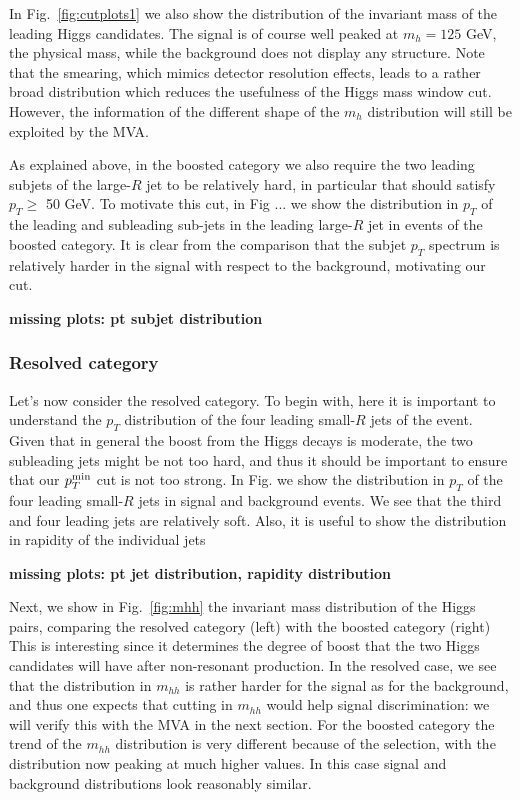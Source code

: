 In Fig.~\ref{fig:cutplots1} we also show the distribution
of the invariant mass of the leading Higgs candidates.
%
The signal is of course well peaked at $m_h=125$ GeV, the physical
mass, while the background does not display any structure.
%
Note that the smearing, which mimics detector resolution effects,
leads to a rather broad distribution which reduces the usefulness
of the Higgs mass window cut.
%
However, the information of the different shape of the $m_{h}$
distribution will still be exploited by the MVA.

As explained above, in the boosted category we also require the two
leading subjets of the large-$R$ jet to be relatively
hard, in particular that should satisfy $p_T \ge $ 50 GeV.
%
To motivate this cut, in Fig ... we show the distribution in $p_T$ of the leading
and subleading sub-jets in the leading large-$R$ jet in events
of the boosted category.
%
It is clear from the comparison that the subjet $p_T$ spectrum is
relatively harder in the signal with respect to the background,
motivating our cut.

{\bf missing plots: pt subjet distribution}

\subsubsection{Resolved category}


Let's now consider the resolved category.
%
To begin with, here it is important to understand the $p_T$ distribution
of the four leading small-$R$ jets of the event.
%
Given that in general the boost from the Higgs decays is moderate,
the two subleading jets might be not too hard, and thus it
should be important to ensure that our $p_T^{\rm min}$ cut
is not too strong.
%
In Fig. we show the distribution in $p_T$ of the four leading
small-$R$ jets in signal and background events.
%
We see that the third and four leading jets are relatively soft.
%
Also, it is useful to show the distribution in rapidity of the
individual jets

{\bf missing plots: pt jet distribution, rapidity distribution}

Next, we show in
Fig.~\ref{fig:mhh} the invariant mass distribution of the Higgs pairs,
comparing the resolved category (left) with the boosted category (right)
%
This is interesting since it determines the degree of boost that the two
Higgs candidates will have after non-resonant production.
%
In the resolved case, we see that the distribution
in $m_{hh}$ is rather harder for the signal as for the background,
and thus one expects that cutting in $m_{hh}$ would help signal
discrimination: we will verify this with the MVA in the next section.
%
For the boosted category the trend of the $m_{hh}$ distribution
is very different because of the selection, with the
distribution now peaking at much higher values.
%
In this case signal and background distributions
look reasonably similar.



